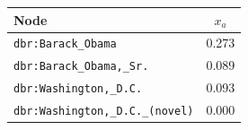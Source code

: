 \begin{figure}[tb!]
\begin{minipage}[b]{0.42\textwidth}
{\begin{tabular}{lc}
            \toprule
            \textbf{Node}  & \textbf{$x_a$} \\
            \midrule
            \texttt{dbr:Barack\_Obama} & 0.273 \\
            \texttt{dbr:Barack\_Obama,\_Sr.} & 0.089 \\
            \texttt{dbr:Washington,\_D.C.} & 0.093 \\
            \texttt{dbr:Washington,\_D.C.\_(novel)} & 0.000 \\
            \bottomrule
        \end{tabular}}
        \label{tab:example}
        \vspace{1.8cm}
	\end{minipage}
\end{figure}



